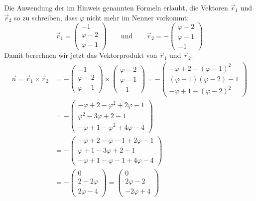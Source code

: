 \begin{loesung}
Die Anwendung der im Hinweis genannten Formeln erlaubt,
die Vektoren $\vec r_1$ und $\vec r_2$ so zu schreiben,
dass $\varphi$ nicht mehr im Nenner vorkommt:
\[
\vec r_1=\begin{pmatrix}
-1\\
\varphi-2\\
\varphi-1
\end{pmatrix}
\qquad\text{und}\qquad
\vec r_2
=-\begin{pmatrix}
\varphi-2\\
\varphi-1\\
-1
\end{pmatrix}
\]
Damit berechnen wir jetzt das Vektorprodukt von $\vec r_1$ und $\vec r_2$:
\begin{align*}
\vec n=
\vec r_1\times\vec r_2
&=
-\begin{pmatrix}
-1\\
\varphi-2\\
\varphi-1
\end{pmatrix}
\times
\begin{pmatrix}
\varphi-2\\
\varphi-1\\
-1
\end{pmatrix}
=
-
\begin{pmatrix}
-\varphi+2-(\varphi-1)^2\\
(\varphi-1)(\varphi-2)-1\\
-\varphi+1-(\varphi-2)^2
\end{pmatrix}
\\
&=
-\begin{pmatrix}
-\varphi+2-\varphi^2+2\varphi-1\\
\varphi^2-3\varphi+2-1\\
-\varphi+1-\varphi^2+4\varphi-4
\end{pmatrix}
\\
&=
-\begin{pmatrix}
-\varphi+2-\varphi-1+2\varphi-1\\
\varphi+1-3\varphi+2-1\\
-\varphi+1-\varphi-1+4\varphi-4
\end{pmatrix}
\\
&=
-\begin{pmatrix}
0\\
2-2\varphi\\
2\varphi-4
\end{pmatrix}
=
\begin{pmatrix}
0\\
2\varphi-2\\
-2\varphi+4

\end{pmatrix}
\end{align*}
\end{loesung}
